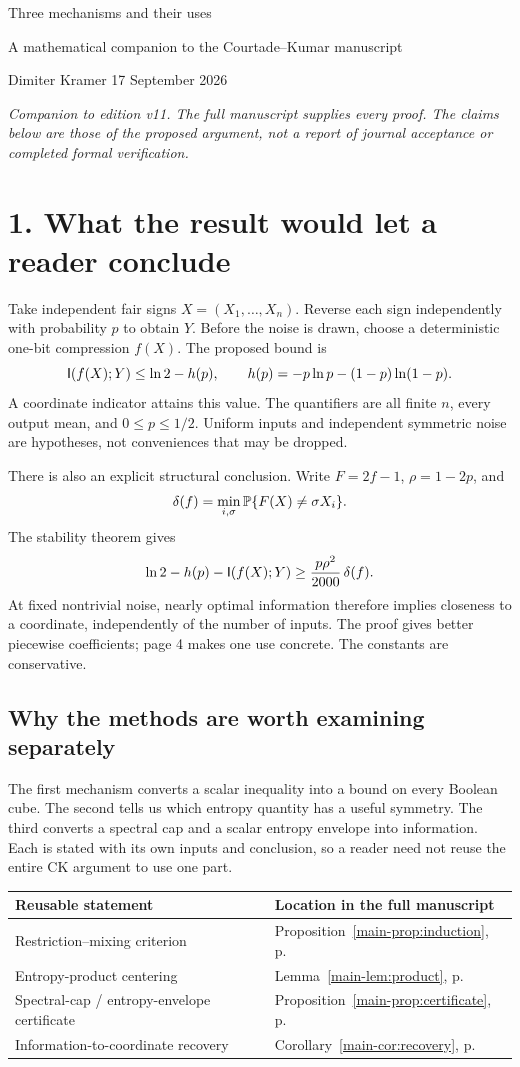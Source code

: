 \documentclass[11pt]{article}
\begin{document}
{\LARGE Three mechanisms and their uses}\par
{\large A mathematical companion to the Courtade--Kumar manuscript}\par
Dimiter Kramer \hfill 17 September 2026\par
\smallskip
\textit{Companion to edition v11. The full manuscript supplies every proof. The claims below are those of the proposed argument, not a report of journal acceptance or completed formal verification.}

\section*{1. What the result would let a reader conclude}
Take independent fair signs $X=(X_1,\ldots,X_n)$. Reverse each sign independently with probability $p$ to obtain $Y$. Before the noise is drawn, choose a deterministic one-bit compression $f(X)$. The proposed bound is
\[
 \mathsf I(f(X);Y)\le\ln2-h(p),\qquad
 h(p)=-p\ln p-(1-p)\ln(1-p).
\]
A coordinate indicator attains this value. The quantifiers are all finite $n$, every output mean, and $0\le p\le1/2$. Uniform inputs and independent symmetric noise are hypotheses, not conveniences that may be dropped.

There is also an explicit structural conclusion. Write $F=2f-1$, $\rho=1-2p$, and
\[
 \delta(f)=\min_{i,\sigma}\mathbb P\{F(X)\ne\sigma X_i\}.
\]
The stability theorem gives
\[
 \ln2-h(p)-\mathsf I(f(X);Y)\ge\frac{p\rho^2}{2000}\,\delta(f).
\]
At fixed nontrivial noise, nearly optimal information therefore implies closeness to a coordinate, independently of the number of inputs. The proof gives better piecewise coefficients; page 4 makes one use concrete. The constants are conservative.

\subsection*{Why the methods are worth examining separately}
The first mechanism converts a scalar inequality into a bound on every Boolean cube. The second tells us which entropy quantity has a useful symmetry. The third converts a spectral cap and a scalar entropy envelope into information. Each is stated with its own inputs and conclusion, so a reader need not reuse the entire CK argument to use one part.

\begin{tabularx}{\textwidth}{@{}p{}X@{}}
\toprule
Reusable statement & Location in the full manuscript\\\midrule
Restriction--mixing criterion & Proposition~\ref{main-prop:induction}, p.~\pageref{main-prop:induction}\\
Entropy-product centering & Lemma~\ref{main-lem:product}, p.~\pageref{main-lem:product}\\
Spectral-cap / entropy-envelope certificate & Proposition~\ref{main-prop:certificate}, p.~\pageref{main-prop:certificate}\\
Information-to-coordinate recovery & Corollary~\ref{main-cor:recovery}, p.~\pageref{main-cor:recovery}\\\bottomrule
\end{tabularx}
\end{document}

